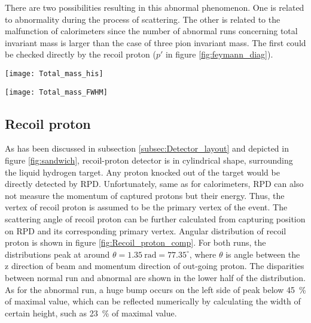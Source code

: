 There are two possibilities resulting in this abnormal phenomenon. One is related to abnormality during the process of scattering. The other is related to the malfunction of calorimeters since the number of abnormal runs concerning total invariant mass is larger than the case of three pion invariant mass. The first could be checked directly by the recoil proton ($p'$ in figure \ref{fig:feymann_diag}).

\begin{figure*}[!ht]
	\centering
	\vspace{2cm}
	\texttt{[image: Total\_mass\_his]}
	\caption{Histogram of invariant total mass distribution. The colors inside the histogram represent number of events corresponding to the run number and invariant mass. To better compare and conceive the structure of distribution between runs visually, the maximal value of each distribution is normalized to 1000. In the red dashed rectangles, it can be seen that the red strokes are much longer than the normal runs.}
	\label{fig:Total_mass_his}
	\vspace{2 cm}
	
	\texttt{[image: Total\_mass\_FWHM]}
	\caption{Value of full width at half maximum of total invariant distribution for each run. Typical value of FWHM for normal run is around \SI{1.5}{\giga\electronvolt}.There are several outliners that have much bigger FWHM value than the general one. Also there is a range of runs 70223 $\sim$ 70240 that have slight smaller value of FWHM. }
	\label{fig:Total_mass_FWHM}
	\vspace{3cm}
\end{figure*}

\subsection{Recoil proton}

\label{subsec:recoil_proton}
As has been discussed in subsection \ref{subsec:Detector_layout} and depicted in figure \ref{fig:sandwich}, recoil-proton detector is in cylindrical shape, surrounding the liquid hydrogen target. Any proton knocked out of the target would be directly detected by RPD. Unfortunately, same as for calorimeters, RPD can also not measure the momentum of captured protons but their energy. Thus, the vertex of recoil proton is assumed to be the primary vertex of the event. The scattering angle of recoil proton can be further calculated from capturing position on RPD and its corresponding primary vertex. Angular distribution of recoil proton is shown in figure \ref{fig:Recoil_proton_comp}. For both runs, the distributions peak at around $\theta=\SI{1.35}{\radian} = 77.35^{\circ}$, where $\theta$ is angle between the z direction of beam and momentum direction of out-going proton. The disparities between normal run and abnormal are shown in the lower half of the distribution. As for the abnormal run, a huge bump occurs on the left side of peak below \SI{45}{\percent} of maximal value, which can be reflected numerically by calculating the width of certain height, such as \SI{23}{\percent} of maximal value.

